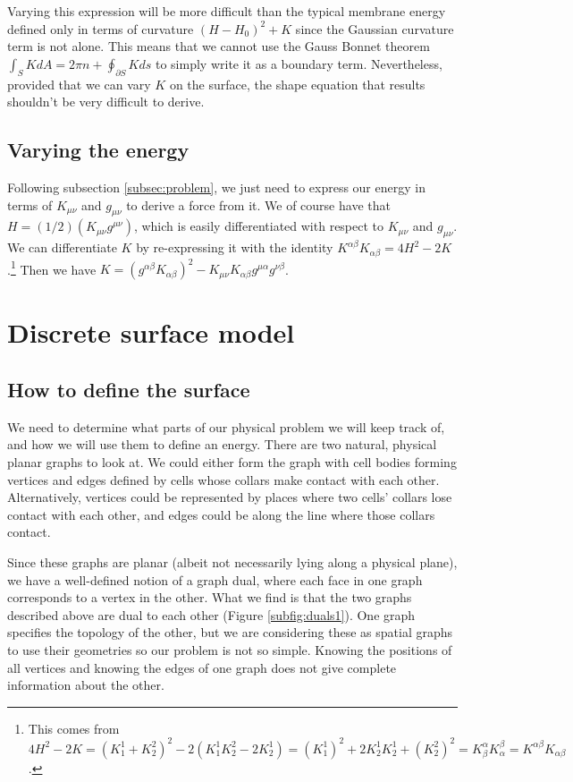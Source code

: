 \documentclass[draft]{article}
\begin{document}
Varying this expression will be more difficult than the typical membrane energy defined only in terms of curvature $(H-H_0)^2 + K$ since the Gaussian curvature term is not alone. This means that we cannot use the Gauss Bonnet theorem $\int_S K dA = 2\pi n + \oint_{\partial S}K ds$ to simply write it as a boundary term. Nevertheless, provided that we can vary $K$ on the surface, the shape equation that results shouldn't be very difficult to derive.

\subsection{Varying the energy}

Following subsection \ref{subsec:problem}, we just need to express our energy in terms of $K_{\mu\nu}$ and $g_{\mu\nu}$ to derive a force from it. We of course have that $H = (1/2) (K_{\mu\nu} g^{\mu\nu})$, which is easily differentiated with respect to $K_{\mu\nu}$ and $g_{\mu\nu}$. We can differentiate $K$ by re-expressing it with the identity $K^{\alpha\beta}K_{\alpha\beta} = 4H^2 - 2K$.\footnote{This comes from $4H^2 - 2K = (K^1_1 + K^2_2)^2 - 2(K^1_1K^2_2 - 2K^1_2) = (K^1_1)^2 + 2 K^1_2K^1_2 + (K^2_2)^2 = K^\alpha_\beta K_\alpha^\beta = K^{\alpha\beta}K_{\alpha\beta}$.} Then we have $K = (g^{\alpha\beta}K_{\alpha\beta})^2 - K_{\mu\nu}K_{\alpha\beta}g^{\mu\alpha}g^{\nu\beta}$.

\newpage
\section{Discrete surface model}
\subsection{How to define the surface}

We need to determine what parts of our physical problem we will keep track of, and how we will use them to define an energy. There are two natural, physical planar graphs to look at. We could either form the graph with cell bodies forming vertices and edges defined by cells whose collars make contact with each other. Alternatively, vertices could be represented by places where two cells' collars lose contact with each other, and edges could be along the line where those collars contact. 

Since these graphs are planar (albeit not necessarily lying along a physical plane), we have a well-defined notion of a graph dual, where each face in one graph corresponds to a vertex in the other. What we find is that the two graphs described above are dual to each other (Figure \ref{subfig:duals1}). One graph specifies the topology of the other, but we are considering these as spatial graphs to use their geometries so our problem is not so simple. Knowing the positions of all vertices and knowing the edges of one graph does not give complete information about the other.
\end{document}
